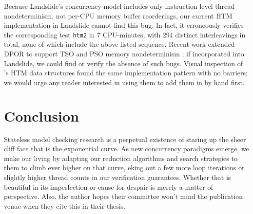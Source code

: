 \documentclass[10pt]{sigplanconf}
\begin{document}
Because Landslide's concurrency model includes only instruction-level thread nondeterminism,
not per-CPU memory buffer reorderings,
our current HTM implementation in Landslide cannot find this bug.
In fact, it erroneously verifies the corresponding test {\tt htm2} in 7 CPU-minutes,
with 294 distinct interleavings in total,
none of which include the above-listed sequence.
Recent work extended DPOR to support TSO and PSO memory nondeterminism \cite{tsopso};
if incorporated into Landslide, we could find or verify the absence of such bugs.
Visual inspection of \cite{htm-mario}'s HTM data structures found the same implementation pattern with no barriers;
we would urge any reader interested in using them to add them in by hand first.


\section{Conclusion}

Stateless model checking research is a perpetual existence of staring up the sheer cliff face that is the exponential curve.
As new concurrency paradigms emerge,
we make our living by adapting our reduction algorithms and search strategies to them to climb ever higher on that curve,
eking out a few more loop iterations or slightly higher thread counts in our verification guarantees.
Whether that is beautiful in its imperfection or cause for despair is merely a matter of perspective.
Also, the author hopes their committee won't mind the publication venue when they cite this in their thesis.




\end{document}

